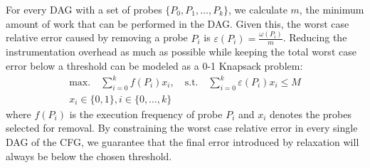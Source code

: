 For every DAG with a set of probes $\{P_0, P_1, \ldots, P_k\}$, we calculate $m$, the minimum amount of work that can be performed in the
DAG. Given this, the worst case relative error caused by removing a probe $P_i$ is $\varepsilon(P_i) = \frac{\omega(P_i)}{m}$. Reducing the
instrumentation overhead as much as possible while keeping the total worst case error below a threshold can be modeled as a 0-1 Knapsack
problem:
\begin{gather*}
\textrm{max.}\quad\sum_{i=0}^{k} f(P_i)x_i,\quad
\textrm{s.t.}\quad\sum_{i=0}^{k} \varepsilon(P_i)x_i \leq M \\
x_i\in\{0,1\}, i\in\{0,\ldots,k\}
\end{gather*}
where $f(P_i)$ is the execution frequency of probe $P_i$ and $x_i$ denotes the probes selected for removal. By constraining the worst case
relative error in every single DAG of the CFG, we guarantee that the final error introduced by relaxation will always be below the chosen
threshold.
%
